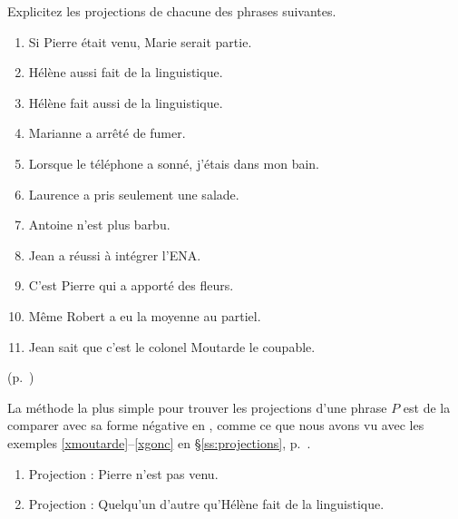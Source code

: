 \begin{exo}\label{exo:1psp1}
Explicitez les projections de chacune des phrases suivantes.
\begin{enumerate}
\item %
Si Pierre était venu, Marie serait partie.

\item %
Hélène aussi fait de la linguistique.\label{x:expsp2}

\item %
Hélène fait aussi  de la linguistique.\label{x:expsp3}

\item %
Marianne a arrêté de fumer.

\item %
Lorsque le téléphone a sonné, j'étais dans mon bain.

\item %
Laurence a pris seulement une salade.

\item %
Antoine n'est plus barbu.

\item %
Jean a réussi à intégrer l'ENA.

\item %
C'est Pierre qui a apporté des fleurs.\label{x:expsp9}

\item %
Même Robert a eu la moyenne au partiel.\label{x:expsp10}

\item %
Jean sait que c'est le colonel Moutarde le coupable.
\end{enumerate}
\begin{solu} (p.~\pageref{exo:1psp1})

La méthode la plus simple pour trouver les projections d'une
phrase $P$ est de la comparer avec sa forme négative en , comme ce que nous avons vu avec les exemples \ref{xmoutarde}--\ref{xgonc} en \S\ref{ss:projections}, p.~\pageref{p.resNeg}.

\begin{enumerate}
\item %
Projection : Pierre n'est pas venu. 

\item %
Projection : Quelqu'un d'autre qu'Hélène fait de la linguistique.


\end{enumerate}
\end{solu}
\end{exo}
